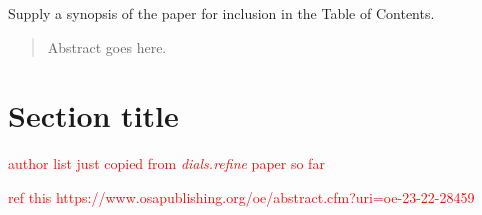 \documentclass[preprint]{iucr}              %
\newcommand{\dialsrefine}{\emph{dials.refine}\xspace}
\newcommand\fixme[1]{\textcolor{red}{#1}}
\begin{document}




\maketitle                        %

\begin{synopsis}
Supply a synopsis of the paper for inclusion in the Table of Contents.
\end{synopsis}

\begin{abstract}
Abstract goes here.
\end{abstract}



\section{Section title}

\fixme{author list just copied from \dialsrefine paper so far}

\fixme{ref this https://www.osapublishing.org/oe/abstract.cfm?uri=oe-23-22-28459}
\end{document}
